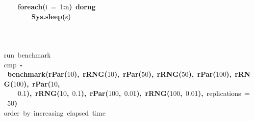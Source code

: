 \documentclass[a4paper,12pt]{article}\usepackage{graphicx, color}
\makeatletter
\newcommand{\hlnumber}[1]{\textcolor[rgb]{0,0,0}{#1}}%
\newcommand{\hlfunctioncall}[1]{\textcolor[rgb]{0.501960784313725,0,0.329411764705882}{\textbf{#1}}}%
\newcommand{\hlkeyword}[1]{\textcolor[rgb]{0,0,0}{\textbf{#1}}}%
\newcommand{\hlargument}[1]{\textcolor[rgb]{0.690196078431373,0.250980392156863,0.0196078431372549}{#1}}%
\newcommand{\hlcomment}[1]{\textcolor[rgb]{0.180392156862745,0.6,0.341176470588235}{#1}}%
\newcommand{\hlassignement}[1]{\textcolor[rgb]{0,0,0}{\textbf{#1}}}%
\newcommand{\hlsymbol}[1]{\textcolor[rgb]{0,0,0}{#1}}%
\newcommand{\hlstd}[1]{\textcolor[rgb]{0,0,0}{#1}}%
\newenvironment{kframe}{%
 \def\FrameCommand##1{\hskip\@totalleftmargin \hskip-\fboxsep
 \colorbox{shadecolor}{##1}\hskip-\fboxsep
     \hskip-\linewidth \hskip-\@totalleftmargin \hskip\columnwidth}%
 \MakeFramed {\advance\hsize-\width
   \@totalleftmargin\z@ \linewidth\hsize
   \@setminipage}}%
 {\par\unskip\endMakeFramed}
\newenvironment{knitrout}{}{} %
\renewenvironment{knitrout}{\begin{footnotesize}}{\end{footnotesize}}
\makeatother
\begin{document}
\begin{knitrout}
\begin{kframe}
\begin{flushleft}
\hlstd{}{\ }{\ }{\ }{\ }\hlfunctioncall{foreach}\hlkeyword{(}\hlargument{i}{\ }\hlargument{=}{\ }\hlnumber{1}\hlkeyword{:}\hlsymbol{n}\hlkeyword{)}{\ }\hlkeyword{\usebox{\hlnormalsizeboxpercent}dorng\usebox{\hlnormalsizeboxpercent}}{\ }\hlkeyword{\usebox{\hlnormalsizeboxopenbrace}}\hspace*{\fill}\\
\hlstd{}{\ }{\ }{\ }{\ }{\ }{\ }{\ }{\ }\hlfunctioncall{Sys.sleep}\hlkeyword{(}\hlsymbol{s}\hlkeyword{)}\hspace*{\fill}\\
\hlstd{}{\ }{\ }{\ }{\ }\hlkeyword{\usebox{\hlnormalsizeboxclosebrace}}\hspace*{\fill}\\
\hlstd{}\hlkeyword{\usebox{\hlnormalsizeboxclosebrace}}\hspace*{\fill}\\
\hlstd{}\hspace*{\fill}\\
\hlstd{}\hlcomment{\usebox{\hlnormalsizeboxhash}{\ }run{\ }benchmark}\hspace*{\fill}\\
\hlstd{}\hlsymbol{cmp}{\ }\hlassignement{\usebox{\hlnormalsizeboxlessthan}-}{\ }\hlfunctioncall{benchmark}\hlkeyword{(}\hlfunctioncall{rPar}\hlkeyword{(}\hlnumber{10}\hlkeyword{)}\hlkeyword{,}{\ }\hlfunctioncall{rRNG}\hlkeyword{(}\hlnumber{10}\hlkeyword{)}\hlkeyword{,}{\ }\hlfunctioncall{rPar}\hlkeyword{(}\hlnumber{50}\hlkeyword{)}\hlkeyword{,}{\ }\hlfunctioncall{rRNG}\hlkeyword{(}\hlnumber{50}\hlkeyword{)}\hlkeyword{,}{\ }\hlfunctioncall{rPar}\hlkeyword{(}\hlnumber{100}\hlkeyword{)}\hlkeyword{,}{\ }\hlfunctioncall{rRNG}\hlkeyword{(}\hlnumber{100}\hlkeyword{)}\hlkeyword{,}{\ }\hlfunctioncall{rPar}\hlkeyword{(}\hlnumber{10}\hlkeyword{,}\hspace*{\fill}\\
\hlstd{}{\ }{\ }{\ }{\ }\hlnumber{0.1}\hlkeyword{)}\hlkeyword{,}{\ }\hlfunctioncall{rRNG}\hlkeyword{(}\hlnumber{10}\hlkeyword{,}{\ }\hlnumber{0.1}\hlkeyword{)}\hlkeyword{,}{\ }\hlfunctioncall{rPar}\hlkeyword{(}\hlnumber{100}\hlkeyword{,}{\ }\hlnumber{0.01}\hlkeyword{)}\hlkeyword{,}{\ }\hlfunctioncall{rRNG}\hlkeyword{(}\hlnumber{100}\hlkeyword{,}{\ }\hlnumber{0.01}\hlkeyword{)}\hlkeyword{,}{\ }\hlargument{replications}{\ }\hlargument{=}{\ }\hlnumber{50}\hlkeyword{)}\hspace*{\fill}\\
\hlstd{}\hlcomment{\usebox{\hlnormalsizeboxhash}{\ }order{\ }by{\ }increasing{\ }elapsed{\ }time}\hspace*{\fill}\\

\end{flushleft}
\end{kframe}
\end{knitrout}
\end{document}
